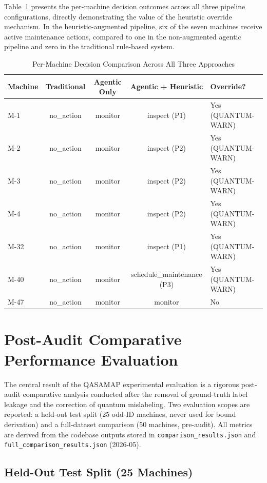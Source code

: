 Table~\ref{tab:per_mac_comparison} presents the per-machine decision outcomes across all three pipeline configurations, directly demonstrating the value of the heuristic override mechanism. In the heuristic-augmented pipeline, six of the seven machines receive active maintenance actions, compared to one in the non-augmented agentic pipeline and zero in the traditional rule-based system.
\begin{table}[!htbp]
\centering
\caption{Per-Machine Decision Comparison Across All Three Approaches}
\label{tab:per_mac_comparison}
\begin{tabular}{lcccl}
\hline
\textbf{Machine} & \textbf{Traditional} & \textbf{Agentic Only} & \textbf{Agentic + Heuristic} & \textbf{Override?} \\
\hline
M-1  & no\_action & monitor & inspect (P1)              & Yes (QUANTUM-WARN) \\
M-2  & no\_action & monitor & inspect (P2)              & Yes (QUANTUM-WARN) \\
M-3  & no\_action & monitor & inspect (P2)              & Yes (QUANTUM-WARN) \\
M-4  & no\_action & monitor & inspect (P2)              & Yes (QUANTUM-WARN) \\
M-32 & no\_action & monitor & inspect (P1)              & Yes (QUANTUM-WARN) \\
M-40 & no\_action & monitor & schedule\_maintenance (P3) & Yes (QUANTUM-WARN) \\
M-47 & no\_action & monitor & monitor                   & No \\
\hline
\end{tabular}
\end{table}
\section{Post-Audit Comparative Performance Evaluation}

The central result of the QASAMAP experimental evaluation is a rigorous post-audit comparative analysis conducted after the removal of ground-truth label leakage and the correction of quantum mislabeling. Two evaluation scopes are reported: a held-out test split (25 odd-ID machines, never used for bound derivation) and a full-dataset comparison (50 machines, pre-audit). All metrics are derived from the codebase outputs stored in \texttt{comparison\_results.json} and \texttt{full\_comparison\_results.json} (2026-05).

\subsection{Held-Out Test Split (25 Machines)}

